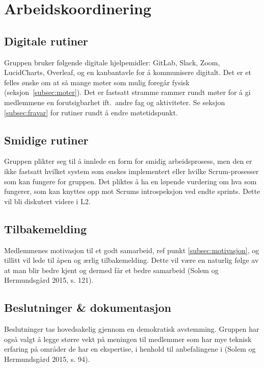 \documentclass[11pt]{article}
\begin{document}
	\section{Arbeidskoordinering}
	\subsection{Digitale rutiner}
	Gruppen bruker følgende digitale hjelpemidler: GitLab, Slack, Zoom, LucidCharts, Overleaf, og en kanbantavle for å kommunisere digitalt. Det er et felles ønske om at så mange møter som mulig foregår fysisk (seksjon~\ref{subsec:moter}).
	\label{subsec:moter}
	Det er fastsatt stramme rammer rundt møter for å gi medlemmene en forutsigbarhet ift.~andre fag og aktiviteter. Se seksjon \ref{subsec:fravar} for rutiner rundt å endre møtetidspunkt.
	
	\subsection{Smidige rutiner}
	\label{subsec:agile}
	Gruppen plikter seg til å innlede en form for smidig arbeidsprosess, men den er ikke fastsatt hvilket system som ønskes implementert eller hvilke Scrum-prosesser som kan fungere for gruppen. Det pliktes å ha en løpende vurdering om hva som fungerer, som kan knyttes opp mot Scrums introspeksjon ved endte sprints. Dette vil bli diskutert videre i L2.
	
	\subsection{Tilbakemelding}
	Medlemmenes motivasjon til et godt samarbeid, ref punkt \ref{subsec:motivasjon}, og tillitt vil lede til åpen og ærlig tilbakemelding. Dette vil være en naturlig følge av at man blir bedre kjent og dermed får et bedre samarbeid (Solem og Hermundsgård 2015, s. 121). 
	
	
	\subsection{Beslutninger \& dokumentasjon}
	\label{sec:beslutninger}
	Beslutninger tas hovedsakelig gjennom en demokratisk avstemming. Gruppen har også valgt å legge større vekt på meningen til medlemmer som har mye teknisk erfaring på områder de har en ekspertise, i henhold til anbefalingene i (Solem og Hermundsgård 2015, s. 94).
	
\end{document}
